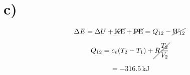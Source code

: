 

\section*{c)}

\[
\Delta E = \Delta U + \cancel{\text{KE}} + \cancel{\text{PE}} = Q_{12} - \cancel{W_{12}}
\]

\[
Q_{12} = c_v (T_2 - T_1) + \cancel{R \frac{T_2}{V_2}}
\]

\[
= -316.5 \, \text{kJ}
\]